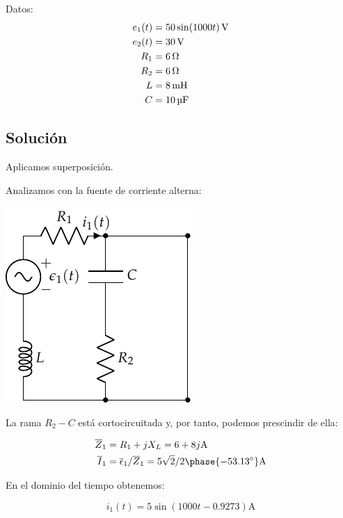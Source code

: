 \documentclass[12pt]{article}
\begin{document}
Datos:
\begin{align*}
  e_1(t) &= \SI[parse-numbers=false]{50 \sin(1000 t)}{\volt}\\
  e_2(t) &= \SI{30}{\volt}\\
  R_1 &= \SI{6}{\ohm}\\
  R_2 &= \SI{6}{\ohm}\\
  L &= \SI{8}{\milli\henry}\\
  C &= \SI{10}{\micro\farad}
\end{align*}


\noindent\hrulefill

\subsection*{Solución}

Aplicamos superposición.

Analizamos con la fuente de corriente alterna:

\begin{center}
\includegraphics{../figs/superposicion1_AC}
\end{center}

La rama $R_2 - C$ está cortocircuitada y, por tanto, podemos prescindir de ella:

\begin{align*}
  \overline{Z}_1 &= R_1 + jX_L = 6 + 8j\si{\ampere}\\
  \overline{I}_1 &= \overline{\epsilon}_1 / \overline{Z}_1 = 5\sqrt{2}/2\phase{\ang{-53.13}}\si{\ampere}
\end{align*}

En el dominio del tiempo obtenemos:

\begin{equation*}
  i_1(t) = 5\sin(1000t - 0.9273)\si{\ampere}
\end{equation*}
\end{document}
